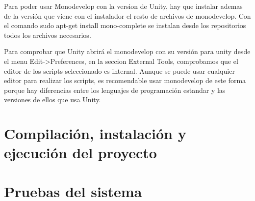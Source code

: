 Para poder usar Monodevelop con la version de Unity, hay que instalar ademas de la versión que viene con el instalador el resto de archivos de monodevelop. Con el comando sudo apt-get install mono-complete se instalan desde los repositorios todos los archivos necesarios.

Para comprobar que Unity abrirá el monodevelop con su versión para unity desde el menu Edit->Preferences, en la seccion External Tools, comprobamos que el editor de  los scripts seleccionado es internal. Aunque se puede usar cualquier editor para realizar los scripts, es recomendable usar monodevelop de este forma porque hay diferencias entre los lenguajes de programación estandar y las versiones de ellos que usa Unity.

\section{Compilación, instalación y ejecución del proyecto}

\section{Pruebas del sistema}

